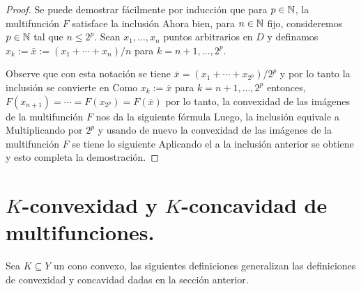 \begin{proof}
Se puede demostrar fácilmente por inducción que para $p\in\mathbb{N}$, 
la multifunción $F$ satisface la inclusión
Ahora bien, para $n\in\mathbb{N}$ fijo, consideremos $p\in\mathbb{N}$ tal que $n\leq2^p$.
Sean $x_1,\ldots,x_n$ puntos arbitrarios en $D$ y definamos
$x_k:=\bar{x}:=(x_1+\cdots+x_n)/n$ para $k=n+1,\ldots,2^p$.

Observe que con esta notación se tiene  
$\bar{x}=(x_1+\cdots+x_{2^p})/2^p$ y por lo tanto la inclusión 
se convierte en
Como $x_k:=\bar{x}$ para $k=n+1,\ldots,2^p$ entonces, 
$F(x_{n+1})=\cdots=F(x_{2^p})=F(\bar{x})$ por lo tanto, 
la convexidad de las imágenes de la multifunción $F$ 
nos da la siguiente fórmula
Luego, la inclusión  equivale a
Multiplicando  por $2^p$ y usando de nuevo la convexidad de las imágenes de la 
multifunción $F$ se tiene lo siguiente
Aplicando el  a la inclusión anterior se obtiene  y esto
completa la demostración.
\end{proof}


\section{$K$-convexidad y $K$-concavidad de multifunciones.}

Sea $K\subseteq Y$ un cono convexo, las siguientes definiciones generalizan
las definiciones de convexidad y concavidad dadas en la sección anterior.

